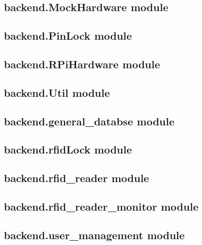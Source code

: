 \documentclass[letterpaper,12pt,english]{sphinxmanual}
\begin{document}
\subsection{backend.MockHardware module}
\label{\detokenize{backend:backend-mockhardware-module}}

\subsection{backend.PinLock module}
\label{\detokenize{backend:backend-pinlock-module}}

\subsection{backend.RPiHardware module}
\label{\detokenize{backend:backend-rpihardware-module}}

\subsection{backend.Util module}
\label{\detokenize{backend:backend-util-module}}

\subsection{backend.general\_databse module}
\label{\detokenize{backend:backend-general-databse-module}}

\subsection{backend.rfidLock module}
\label{\detokenize{backend:backend-rfidlock-module}}

\subsection{backend.rfid\_reader module}
\label{\detokenize{backend:backend-rfid-reader-module}}

\subsection{backend.rfid\_reader\_monitor module}
\label{\detokenize{backend:backend-rfid-reader-monitor-module}}

\subsection{backend.user\_management module}
\label{\detokenize{backend:backend-user-management-module}}
\end{document}
